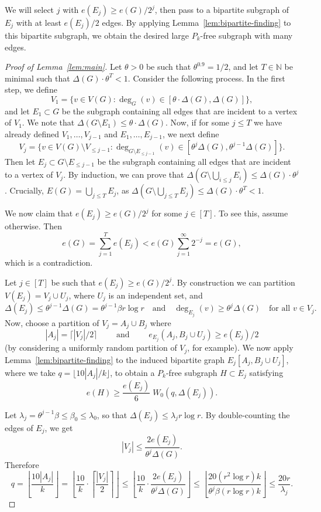 \documentclass[12pt,reqno]{amsart}
\theoremstyle{remark}
\numberwithin{theorem}{section}
\renewcommand{\(}{\bigl(}
\renewcommand{\)}{\bigr)\vphantom{)}}
\renewcommand{\leq}{\le}
\renewcommand{\geq}{\ge}
\renewcommand{\le}{\leqslant}
\renewcommand{\ge}{\geqslant}
\begin{document}
We will select $j$ with $e(E_j)\geq e(G)/2^j$, then pass to a bipartite subgraph of $E_j$ with at least $e(E_j)/2$ edges. By applying Lemma~\ref{lem:bipartite-finding} to this bipartite subgraph, we obtain the desired large $P_k$-free subgraph with many edges.

\begin{proof}[Proof of Lemma~\ref{lem:main}] Let $\theta  >0$ be such that $\theta^{0.9}=1/2$, and let $T\in \mathbb{N}$ be minimal such that $\Delta(G)\cdot \theta^{T}< 1$. Consider the following process. In the first step, we define \[ V_1=\big\{v\in V(G): \deg_{G}(v)\in[\theta\cdot \Delta(G), \Delta(G)] \big\},\] and let $E_1\subset G$ be the subgraph containing all edges that are incident to a vertex of $V_1$. We note that $\Delta(G\setminus E_1)\leq \theta\cdot \Delta(G)$. Now, if for some $j\leq T$ we have already defined $V_1, \dots, V_{j-1}$ and $E_1, \dots, E_{j-1}$, we next define\[ V_j=\big\{v\in V(G)\setminus V_{\leq j-1}: \deg_{G\setminus E_{\leq j-1}}(v)\in [\theta^j\Delta(G),\theta^{j-1}\Delta(G)] \big\}.\] Then let $E_j\subset G\setminus E_{\leq j-1}$ be the subgraph containing all edges that are incident to a vertex of $V_j$. By induction, we can prove that $\Delta(G\setminus \bigcup_{i\leq j}E_i)\leq \Delta(G)\cdot \theta^{j}$. Crucially, $E(G)=\bigcup_{j\leq T}E_j$, as $\Delta(G\setminus \bigcup_{j\leq T}E_j)\leq \Delta(G)\cdot \theta^{T}<1$.
    
We now claim that $e(E_j)\geq e(G)/2^j$ for some $j\in [T]$. To see this, assume otherwise. Then
    \[e(G)=\sum_{j=1}^Te(E_j)<e(G)\sum_{j=1}^{\infty}2^{-j}=e(G),\] which is a contradiction.  

Let $j \in [T]$ be such that $e(E_j) \geq e(G)/2^j$. By construction we can partition $V(E_j)=V_j\cup U_j$, where $U_j$ is an independent set, and 
\[\Delta(E_j)\leq \theta^{j-1}\Delta(G)=\theta^{j-1}\beta r\log r\quad \text{and} \quad \deg_{E_j}(v) \geq \theta^j\Delta(G) \quad\text{for all $v\in V_j$.}\]
Now, choose a partition of $V_j = A_j \cup B_j$ where 
\[ |A_j| = \lceil |V_j|/2 \rceil \qquad \text{ and } \qquad e_{E_j}(A_j, B_j \cup U_j) \geq e(E_j)/2\] (by considering a uniformly random partition of $V_j$, for example). We now apply Lemma~\ref{lem:bipartite-finding} to the induced bipartite graph $E_j[A_j, B_j \cup U_j]$, where we take $q=\lfloor 10|A_j|/k\rfloor$, to obtain a $P_k$-free subgraph $H\subset E_j$ satisfying
    \[e(H)\geq \frac{e(E_j)}{6} \;W_0(q,\Delta(E_j)).\]

Let $\lambda_j=\theta^{j-1}\beta\leq \beta_0\leq \lambda_0$, so that $\Delta(E_j)\leq\lambda_j r\log r$. By double-counting the edges of $E_j$, we get \[|V_j|\leq \frac{2e(E_j)}{\theta^{j}\Delta(G)}.\]
Therefore
\[ q=\left\lfloor\frac{10|A_j|}{k}
\right\rfloor=\left\lfloor\frac{10}{k}\cdot\left\lceil\frac{|V_j|}{2}\right\rceil\right\rfloor \leq \left\lfloor\frac{10}{k}\cdot\frac{2e(E_j)}{\theta^{j}\Delta(G)}\right\rfloor\leq \left\lfloor\frac{20(r^2\log r)k}{\theta^j\beta (r\log r) k}\right\rfloor\leq\frac{20r}{\lambda_j}.\]



\end{proof}
\end{document}
